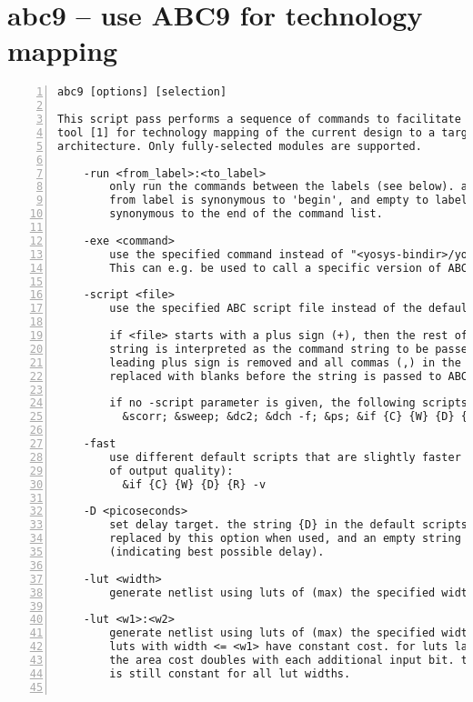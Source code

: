\section{abc9 -- use ABC9 for technology mapping}
\label{cmd:abc9}
\begin{lstlisting}[numbers=left,frame=single]
    abc9 [options] [selection]

This script pass performs a sequence of commands to facilitate the use of the ABC
tool [1] for technology mapping of the current design to a target FPGA
architecture. Only fully-selected modules are supported.

    -run <from_label>:<to_label>
        only run the commands between the labels (see below). an empty
        from label is synonymous to 'begin', and empty to label is
        synonymous to the end of the command list.

    -exe <command>
        use the specified command instead of "<yosys-bindir>/yosys-abc" to execute ABC.
        This can e.g. be used to call a specific version of ABC or a wrapper.

    -script <file>
        use the specified ABC script file instead of the default script.

        if <file> starts with a plus sign (+), then the rest of the filename
        string is interpreted as the command string to be passed to ABC. The
        leading plus sign is removed and all commas (,) in the string are
        replaced with blanks before the string is passed to ABC.

        if no -script parameter is given, the following scripts are used:
          &scorr; &sweep; &dc2; &dch -f; &ps; &if {C} {W} {D} {R} -v; &mfs

    -fast
        use different default scripts that are slightly faster (at the cost
        of output quality):
          &if {C} {W} {D} {R} -v

    -D <picoseconds>
        set delay target. the string {D} in the default scripts above is
        replaced by this option when used, and an empty string otherwise
        (indicating best possible delay).

    -lut <width>
        generate netlist using luts of (max) the specified width.

    -lut <w1>:<w2>
        generate netlist using luts of (max) the specified width <w2>. All
        luts with width <= <w1> have constant cost. for luts larger than <w1>
        the area cost doubles with each additional input bit. the delay cost
        is still constant for all lut widths.


\end{lstlisting}

